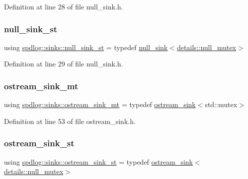 Definition at line 28 of file null\+\_\+sink.\+h.

\mbox{\label{namespacespdlog_1_1sinks_a44a99e8a56b2f902ffd50da4f8628100}} 
\subsubsection{\texorpdfstring{null\+\_\+sink\+\_\+st}{null\_sink\_st}}
{\footnotesize\ttfamily using \hyperlink{namespacespdlog_1_1sinks_a44a99e8a56b2f902ffd50da4f8628100}{spdlog\+::sinks\+::null\+\_\+sink\+\_\+st} = typedef \hyperlink{classspdlog_1_1sinks_1_1null__sink}{null\+\_\+sink}$<$\hyperlink{structspdlog_1_1details_1_1null__mutex}{details\+::null\+\_\+mutex}$>$}



Definition at line 29 of file null\+\_\+sink.\+h.

\mbox{\label{namespacespdlog_1_1sinks_aeef023d4552e1e9be997bec2aa2fb184}} 
\subsubsection{\texorpdfstring{ostream\+\_\+sink\+\_\+mt}{ostream\_sink\_mt}}
{\footnotesize\ttfamily using \hyperlink{namespacespdlog_1_1sinks_aeef023d4552e1e9be997bec2aa2fb184}{spdlog\+::sinks\+::ostream\+\_\+sink\+\_\+mt} = typedef \hyperlink{classspdlog_1_1sinks_1_1ostream__sink}{ostream\+\_\+sink}$<$std\+::mutex$>$}



Definition at line 53 of file ostream\+\_\+sink.\+h.

\mbox{\label{namespacespdlog_1_1sinks_a7c6131fdceb0975b2700d70994a6b351}} 
\subsubsection{\texorpdfstring{ostream\+\_\+sink\+\_\+st}{ostream\_sink\_st}}
{\footnotesize\ttfamily using \hyperlink{namespacespdlog_1_1sinks_a7c6131fdceb0975b2700d70994a6b351}{spdlog\+::sinks\+::ostream\+\_\+sink\+\_\+st} = typedef \hyperlink{classspdlog_1_1sinks_1_1ostream__sink}{ostream\+\_\+sink}$<$\hyperlink{structspdlog_1_1details_1_1null__mutex}{details\+::null\+\_\+mutex}$>$}



